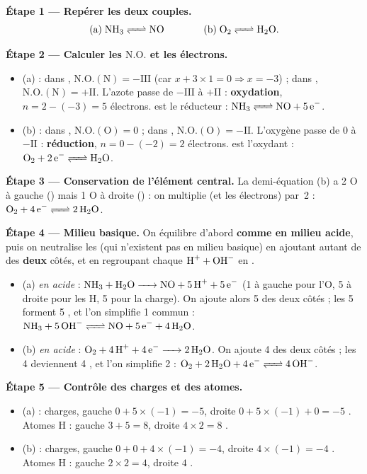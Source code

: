 \documentclass[11pt,a4paper]{article}
\newcommand{\NO}{\ensuremath{\mathrm{N.O.}}}    %
\begin{document}
\begin{exemple}[équilibrage en milieu basique : \ce{NH3 + O2 <=> NO + H2O}]
\textbf{Étape 1 — Repérer les deux couples.}
\[
\text{(a)}\;\ce{NH3 <=> NO}\qquad\qquad\text{(b)}\;\ce{O2 <=> H2O}.
\]

\textbf{Étape 2 — Calculer les $\NO$ et les électrons.}
\begin{itemize}[leftmargin=1.6em,topsep=1pt,itemsep=2pt]
  \item (a) : dans , $\NO(\mathrm{N})=-\mathrm{III}$ (car $x+3\times1=0\Rightarrow x=-3$) ;
        dans , $\NO(\mathrm{N})=+\mathrm{II}$. L'azote passe de $-\mathrm{III}$ à
        $+\mathrm{II}$ : \textbf{oxydation}, $n=2-(-3)=5$ électrons.  est le réducteur :
        $\ce{NH3 <=> NO + 5 e^-}$.
  \item (b) : dans , $\NO(\mathrm{O})=0$ ; dans , $\NO(\mathrm{O})=-\mathrm{II}$.
        L'oxygène passe de $0$ à $-\mathrm{II}$ : \textbf{réduction}, $n=0-(-2)=2$ électrons.
         est l'oxydant : $\ce{O2 + 2 e^- <=> H2O}$.
\end{itemize}

\textbf{Étape 3 — Conservation de l'élément central.} La demi-équation (b) a 2 O à gauche ()
mais 1 O à droite () : on multiplie  (et les électrons) par~2 :
$\ce{O2 + 4 e^- <=> 2 H2O}$.

\textbf{Étape 4 — Milieu basique.} On équilibre d'abord \textbf{comme en milieu acide}, puis on
neutralise les  (qui n'existent pas en milieu basique) en ajoutant autant de  des
\textbf{deux} côtés, et en regroupant chaque $\ce{H+ + OH^-}$ en .
\begin{itemize}[leftmargin=1.6em,topsep=1pt,itemsep=2pt]
  \item (a) \emph{en acide} : $\ce{NH3 + H2O -> NO + 5 H+ + 5 e^-}$ (1  à gauche pour l'O,
        5  à droite pour les H, 5  pour la charge). On ajoute alors 5  des
        deux côtés ; les 5  forment 5 , et l'on simplifie 1  commun :
        $\ce{NH3 + 5 OH^- <=> NO + 5 e^- + 4 H2O}$.
  \item (b) \emph{en acide} : $\ce{O2 + 4 H+ + 4 e^- -> 2 H2O}$. On ajoute 4  des deux côtés ;
        les 4  deviennent 4 , et l'on simplifie 2  :
        $\ce{O2 + 2 H2O + 4 e^- <=> 4 OH^-}$.
\end{itemize}

\textbf{Étape 5 — Contrôle des charges et des atomes.}
\begin{itemize}[leftmargin=1.6em,topsep=1pt,itemsep=1pt]
  \item (a) : charges, gauche $0+5\times(-1)=-5$, droite $0+5\times(-1)+0=-5$ \checkmark.
        Atomes H : gauche $3+5=8$, droite $4\times2=8$ \checkmark.
  \item (b) : charges, gauche $0+0+4\times(-1)=-4$, droite $4\times(-1)=-4$ \checkmark.
        Atomes H : gauche $2\times2=4$, droite $4$ \checkmark.
\end{itemize}


\end{exemple}
\end{document}
